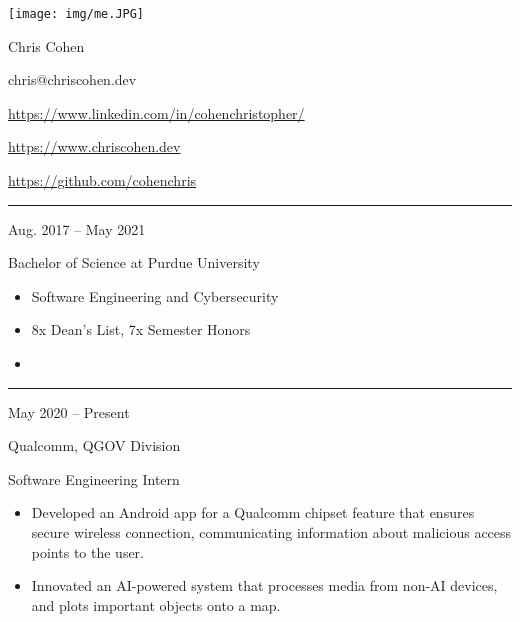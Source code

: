 \documentclass[a4paper]{article}
\newlength{\cvcolumngapwidth}
\newlength{\cvleftcolumnwidth}
\newlength{\cvrightcolumnwidth}
\newcommand{\cvnamestyle}[1]{{\Huge\cvnamefont\textcolor{cvnamecolor}{#1}}}
\newcommand{\cvsectionstyle}[1]{{\normalsize\cvsectionfont\textcolor{cvsectioncolor}{#1}}}
\newcommand{\cvtitlestyle}[1]{{\large\cvtitlefont\textcolor{cvtitlecolor}{#1}}}
\newcommand{\cvdurationstyle}[1]{{\small\cvdurationfont\textcolor{cvdurationcolor}{#1}}}
\newcommand{\italicstyle}[1]{{\small\italicfont\textcolor{cvsectioncolor}{#1}}}
\newlength{\cvafteritemskipamount}
\newlength{\cvaftersectionskipamount}
\newlength{\cvafternameskipamount}
\newlength{\cvafterpersonalinfolineskipamount}
\newlength{\cvaftertitleskipamount}
\newlength{\cvparskip}
\newcommand{\cvpersonalinfo}[2]{
    \begin{minipage}[t]{\cvleftcolumnwidth}
        \vspace{0mm} %
        \raggedleft #1
    \end{minipage}%
    \hspace{\cvcolumngapwidth}%
    \begin{minipage}[t]{\cvrightcolumnwidth}
        \vspace{0mm} %
        #2
    \end{minipage}

    \vspace{\cvafteritemskipamount}
}
\newcommand{\cvname}[1]{
    \cvnamestyle{#1}

    \vspace{\cvafternameskipamount}
}
\newcommand{\cvpersonalinfolinewithicon}[3]{
    \raisebox{.5\fontcharht\font`E-.5\height}{\texttt{[image: \#2]}}
    #3

    \vspace{\cvafterpersonalinfolineskipamount}
}
\newcommand{\cvsection}[1]{
    \begin{minipage}[t]{\cvleftcolumnwidth}
        \raggedleft\cvsectionstyle{#1}
    \end{minipage}%
    \hspace{\cvcolumngapwidth}%
    \begin{minipage}[t]{\cvrightcolumnwidth}
        \textcolor{cvrulecolor}{\rule{\cvrightcolumnwidth}{0.3mm}}
    \end{minipage}

    \vspace{\cvaftersectionskipamount}
}
\newcommand{\cvitem}[2]{
    \begin{minipage}[t]{\cvleftcolumnwidth}
        \raggedleft #1
    \end{minipage}%
    \hspace{\cvcolumngapwidth}%
    \begin{minipage}[t]{\cvrightcolumnwidth}
        \setlength{\parskip}{\cvparskip} #2
    \end{minipage}

    \vspace{\cvafteritemskipamount}
}
\newcommand{\cvtitle}[1]{
    \cvtitlestyle{#1}

    \vspace{\cvaftertitleskipamount}
    \vspace{-\cvparskip}
}
\begin{document}

\cvpersonalinfo{
    \texttt{[image: img/me.JPG]}
}{
    \cvname{\textcolor{emphasiscolor}{Chris Cohen}}


    \cvpersonalinfolinewithicon{height=4mm}{img/email.png}{
      chris@chriscohen.dev
    }

    \cvpersonalinfolinewithicon{height=4mm}{img/linkedin.png}{
      \href{https://www.linkedin.com/in/cohenchristopher/}{https://www.linkedin.com/in/cohenchristopher/}
    }

    \cvpersonalinfolinewithicon{height=4mm}{img/website.png}{
      \href{https://www.chriscohen.dev}{https://www.chriscohen.dev}
    }

    \cvpersonalinfolinewithicon{height=4mm}{img/github.png}{
      \href{https://github.com/cohenchris}{https://github.com/cohenchris}
    }
}


\cvsection{\LARGE \textcolor{emphasiscolor}{EDUCATION}}

\cvitem{
    \cvdurationstyle{Aug. 2017 -- May 2021}
}{
  \cvtitle{Bachelor of Science at Purdue University}


    \begin{itemize}[leftmargin=*]
      \item Software Engineering and Cybersecurity
      \item 8x Dean's List, 7x Semester Honors
      \item \large{\regularfont{\textcolor{emphasiscolor}{3.83 GPA}}}
    \end{itemize}
}


\cvsection{\LARGE \textcolor{emphasiscolor}{EMPLOYMENT}}

\cvitem{
    \cvdurationstyle{May 2020 -- Present}
}{
    \cvtitle{Qualcomm, QGOV Division}

    \italicstyle{Software Engineering Intern}

    \normalsize
    \begin{itemize}[leftmargin=*]
        \item Developed an Android app for a Qualcomm chipset feature that ensures secure wireless connection,
          communicating information about malicious access points to the user.
        \item Innovated an AI-powered system that processes media from non-AI devices, and plots important objects onto a map.
    \end{itemize}
    \vspace{2mm}
}
\end{document}

